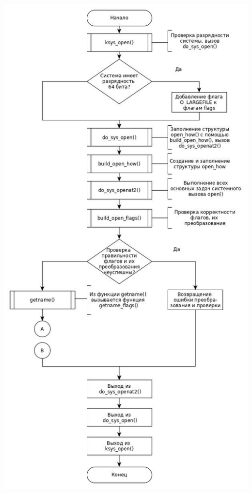 \documentclass[a4paper,14pt]{extreport} %
\begin{document}
\begin{figure}[th]
\noindent\centering{
}
\end{figure}

\newpage
\includegraphics[scale=0.57]{1.jpg}
\end{document}
